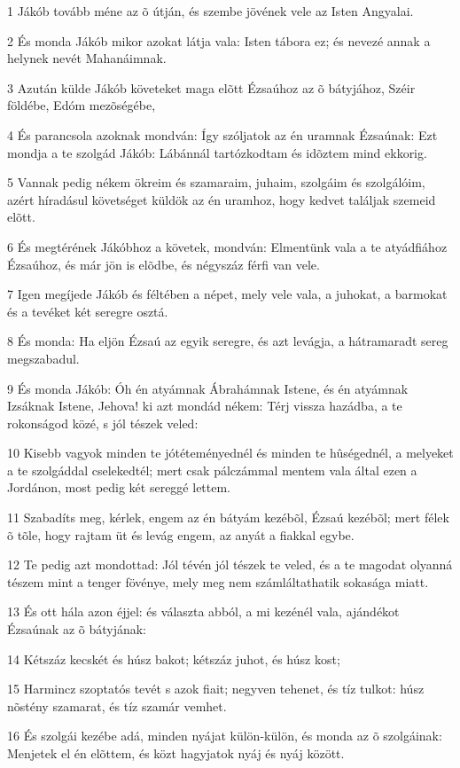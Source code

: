 \par 1 Jákób tovább méne az õ útján, és szembe jövének vele az Isten Angyalai.
\par 2 És monda Jákób mikor azokat látja vala: Isten tábora ez; és nevezé annak a helynek nevét Mahanáimnak.
\par 3 Azután külde Jákób követeket maga elõtt Ézsaúhoz az õ bátyjához, Széir földébe, Edóm mezõségébe,
\par 4 És parancsola azoknak mondván: Így szóljatok az én uramnak Ézsaúnak: Ezt mondja a te szolgád Jákób: Lábánnál tartózkodtam és idõztem mind ekkorig.
\par 5 Vannak pedig nékem ökreim és szamaraim, juhaim, szolgáim és szolgálóim, azért híradásul követséget küldök az én uramhoz, hogy kedvet találjak szemeid elõtt.
\par 6 És megtérének Jákóbhoz a követek, mondván: Elmentünk vala a te atyádfiához Ézsaúhoz, és már jön is elõdbe, és négyszáz férfi van vele.
\par 7 Igen megíjede Jákób és féltében a népet, mely vele vala, a juhokat, a barmokat és a tevéket két seregre osztá.
\par 8 És monda: Ha eljön Ézsaú az egyik seregre, és azt levágja, a hátramaradt sereg megszabadul.
\par 9 És monda Jákób: Óh én atyámnak Ábrahámnak Istene, és én atyámnak Izsáknak Istene, Jehova! ki azt mondád nékem: Térj vissza hazádba, a te rokonságod közé, s jól tészek veled:
\par 10 Kisebb vagyok minden te jótéteményednél és minden te hûségednél, a melyeket a te szolgáddal cselekedtél; mert csak pálczámmal mentem vala által ezen a Jordánon, most pedig két sereggé lettem.
\par 11 Szabadíts meg, kérlek, engem az én bátyám kezébõl, Ézsaú kezébõl; mert félek õ tõle, hogy rajtam üt és levág engem, az anyát a fiakkal egybe.
\par 12 Te pedig azt mondottad: Jól tévén jól tészek te veled, és a te magodat olyanná tészem mint a tenger fövénye, mely meg nem számláltathatik sokasága miatt.
\par 13 És ott hála azon éjjel: és választa abból, a mi kezénél vala, ajándékot Ézsaúnak az õ bátyjának:
\par 14 Kétszáz kecskét és húsz bakot; kétszáz juhot, és húsz kost;
\par 15 Harmincz szoptatós tevét s azok fiait; negyven tehenet, és tíz tulkot: húsz nõstény szamarat, és tíz szamár vemhet.
\par 16 És szolgái kezébe adá, minden nyájat külön-külön, és monda az õ szolgáinak: Menjetek el én elõttem, és közt hagyjatok nyáj és nyáj között.
